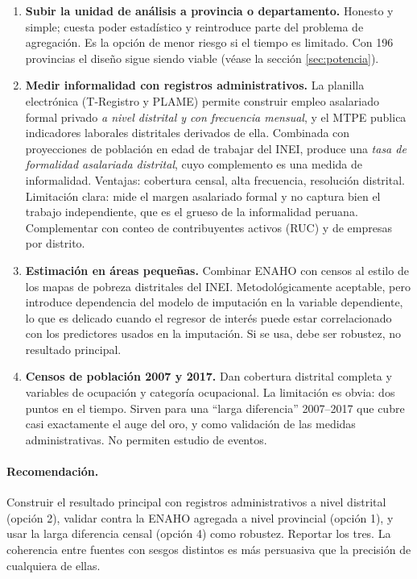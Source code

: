 \documentclass[11pt,a4paper]{article}
\begin{document}
\begin{enumerate}[leftmargin=1.6em,itemsep=3pt]
\item \textbf{Subir la unidad de análisis a provincia o departamento.} Honesto y simple; cuesta poder estadístico y reintroduce parte del problema de agregación. Es la opción de menor riesgo si el tiempo es limitado. Con 196 provincias el diseño sigue siendo viable (véase la sección \ref{sec:potencia}).
\item \textbf{Medir informalidad con registros administrativos.} La planilla electrónica (T-Registro y PLAME) permite construir empleo asalariado formal privado \emph{a nivel distrital y con frecuencia mensual}, y el MTPE publica indicadores laborales distritales derivados de ella. Combinada con proyecciones de población en edad de trabajar del INEI, produce una \emph{tasa de formalidad asalariada distrital}, cuyo complemento es una medida de informalidad. Ventajas: cobertura censal, alta frecuencia, resolución distrital. Limitación clara: mide el margen asalariado formal y no captura bien el trabajo independiente, que es el grueso de la informalidad peruana. Complementar con conteo de contribuyentes activos (RUC) y de empresas por distrito.
\item \textbf{Estimación en áreas pequeñas.} Combinar ENAHO con censos al estilo de los mapas de pobreza distritales del INEI. Metodológicamente aceptable, pero introduce dependencia del modelo de imputación en la variable dependiente, lo que es delicado cuando el regresor de interés puede estar correlacionado con los predictores usados en la imputación. Si se usa, debe ser robustez, no resultado principal.
\item \textbf{Censos de población 2007 y 2017.} Dan cobertura distrital completa y variables de ocupación y categoría ocupacional. La limitación es obvia: dos puntos en el tiempo. Sirven para una ``larga diferencia'' 2007--2017 que cubre casi exactamente el auge del oro, y como validación de las medidas administrativas. No permiten estudio de eventos.
\end{enumerate}

\paragraph{Recomendación.} Construir el resultado principal con registros administrativos a nivel distrital (opción 2), validar contra la ENAHO agregada a nivel provincial (opción 1), y usar la larga diferencia censal (opción 4) como robustez. Reportar los tres. La coherencia entre fuentes con sesgos distintos es más persuasiva que la precisión de cualquiera de ellas.
\end{document}
